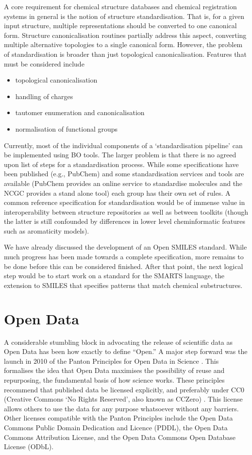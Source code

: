 \documentclass[10pt]{bmc_article}
\newenvironment{bmcformat}{\fussy\setboolean{publ}{true}}{\fussy}
\begin{document}
\begin{bmcformat}
A core requirement for chemical structure databases and chemical
registration systems in general is the notion of structure
standardisation.  That is,  for a given input structure, multiple
representations should be converted to one canonical form.
Structure canonicalisation routines partially address this aspect,
converting multiple alternative topologies to a single canonical
form. However, the problem of standardisation is broader than just
topological canonicalisation. Features that must be considered include
\begin{itemize}
\item topological canonicalisation
\item handling of charges
\item tautomer enumeration and canonicalisation
\item normalisation of functional groups
\end{itemize}
Currently, most of the individual components of a `standardisation
pipeline' can be implemented using BO tools. The larger problem is
that there is no agreed upon list of steps for a standardisation
process. While some specifications have been published (e.g., PubChem)
and some standardisation services and tools are available (PubChem
provides an online service to standardise molecules and the NCGC
provides a stand alone tool) each group has their own set of rules. A
common reference specification for standardisation would be of immense
value in interoperability between structure repositories as well as
between toolkits (though the latter is still confounded by differences
in lower level cheminformatic features such as aromaticity models).

We have already discussed the development of an Open SMILES standard.
While much progress has been made towards a complete specification,
more remains to be done before this can be considered finished. After
that point, the next logical step would be to start work on a standard
for the SMARTS language, the extension to SMILES that specifies
patterns that match chemical substructures.

\section*{Open Data}

A considerable stumbling block in advocating the release of scientific
data as Open Data has been how exactly to define ``Open.'' A major step
forward was the launch in 2010 of the Panton Principles for Open Data
in Science \cite{WebPanton}. This formalises the idea that Open Data maximises the
possibility of reuse and repurposing, the fundamental basis
of how science works. These principles recommend that published data
be licensed explicitly, and preferably under CC0 (Creative Commons `No
Rights Reserved', also known as CCZero) \cite{WebCC0}. This license allows others to use the
data for any purpose whatsoever without any barriers. Other licenses
compatible with the Panton Principles include the
Open Data Commons Public Domain Dedication and Licence (PDDL), the
Open Data Commons Attribution License, and the
Open Data Commons Open Database License (ODbL).\cite{WebOpenData}


\end{bmcformat}
\end{document}
